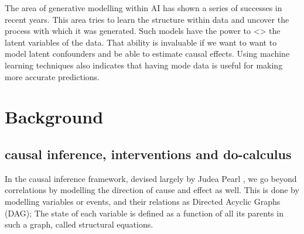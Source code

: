 \documentclass{article}
\begin{document}

The area of generative modelling within AI has shown a series of successes in recent years. This area tries to learn the structure within data and uncover the process with which it was generated. Such models have the power to <> the latent variables of the data. That ability is invaluable if we want to want to model latent confounders and be able to estimate causal effects. Using machine learning techniques also indicates that having mode data is useful for making more accurate predictions. %



\section{Background}

\subsection{causal inference, interventions and do-calculus}

In the causal inference framework, devised largely by Judea Pearl\cite{pearl1995causal} \cite{pearl2009causal}, we go beyond correlations by modelling the direction of cause and effect as well. This is done by modelling variables or events, and their relations as Directed Acyclic Graphs (DAG); The state of each variable is defined as a function of all its parents in such a graph, called structural equations.
\end{document}
